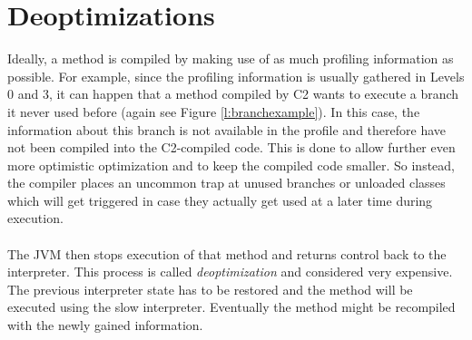 \section{Deoptimizations}
\label{s:deoptimizations}
Ideally, a method is compiled by making use of as much profiling information as possible.
For example, since the profiling information is usually gathered in Levels 0 and 3, it can happen that a method compiled by C2 wants to execute a branch it never used before (again see Figure \ref{l:branchexample}).
In this case, the information about this branch is not available in the profile and therefore have not been compiled into the C2-compiled code.
This is done to allow further even more optimistic optimization and to keep the compiled code smaller. So instead, the compiler places an uncommon trap at unused branches or unloaded classes which will get triggered in case they actually get used at a later time during execution.
\\\\
The JVM then stops execution of that method and returns control back to the interpreter. This process is called \textit{deoptimization} and considered very expensive. The previous interpreter state has to be restored and the method will be executed using the slow interpreter. Eventually the method might be recompiled with the newly gained information.

